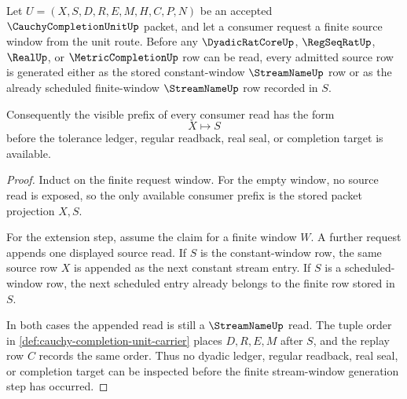 \begin{theorem}
\label{thm:cauchy-completion-unit-constant-window-induction}
Let $U=(X,S,D,R,E,M,H,C,P,N)$ be an accepted $\CauchyCompletionUnitUp$ packet, and let a consumer request a finite source window from the unit route. Before any $\DyadicRatCoreUp$, $\RegSeqRatUp$, $\RealUp$, or $\MetricCompletionUp$ row can be read, every admitted source row is generated either as the stored constant-window $\StreamNameUp$ row or as the already scheduled finite-window $\StreamNameUp$ row recorded in $S$.

Consequently the visible prefix of every consumer read has the form
$$
X\longmapsto S
$$
before the tolerance ledger, regular readback, real seal, or completion target is available.
\end{theorem}
\begin{proof}
Induct on the finite request window. For the empty window, no source read is exposed, so the only available consumer prefix is the stored packet projection $X,S$.

For the extension step, assume the claim for a finite window $W$. A further request appends one displayed source read. If $S$ is the constant-window row, the same source row $X$ is appended as the next constant stream entry. If $S$ is a scheduled-window row, the next scheduled entry already belongs to the finite row stored in $S$.

In both cases the appended read is still a $\StreamNameUp$ read. The tuple order in \autoref{def:cauchy-completion-unit-carrier} places $D,R,E,M$ after $S$, and the replay row $C$ records the same order. Thus no dyadic ledger, regular readback, real seal, or completion target can be inspected before the finite stream-window generation step has occurred.
\end{proof}

